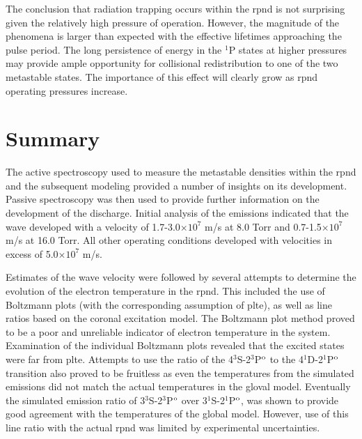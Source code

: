 The conclusion that radiation trapping occurs within the \acs{rpnd} is not
surprising given the relatively high pressure of operation. However, the
magnitude of the phenomena is larger than expected with the effective lifetimes
approaching the pulse period. The long persistence of energy in the $^1$P states
at higher pressures may provide ample opportunity for collisional redistribution
to one of the two metastable states. The importance of this effect will clearly
grow as \acs{rpnd} operating pressures increase.

\section{Summary}

The active spectroscopy used to measure the metastable densities within the
\acs{rpnd} and the subsequent modeling provided a number of insights on its
development. Passive spectroscopy was then used to provide further information
on the development of the discharge. Initial analysis of the emissions indicated
that the wave developed with a velocity of 1.7-3.0$\times10^7$ m/s at 8.0 Torr
and 0.7-1.5$\times10^7$ m/s at 16.0 Torr. All other operating conditions
developed with velocities in excess of 5.0$\times10^7$ m/s.

Estimates of the wave velocity were followed by several attempts to determine
the evolution of the electron temperature in the \acs{rpnd}. This included the
use of Boltzmann plots (with the corresponding assumption of \acs{plte}), as
well as line ratios based on the coronal excitation model. The Boltzmann plot
method proved to be a poor and unreliable indicator of electron temperature in
the system. Examination of the individual Boltzmann plots revealed that the
excited states were far from \acs{plte}. Attempts to use the ratio of the
4$^3$S-2$^3$P$^\mathrm{o}$ to the 4$^1$D-2$^1$P$^\mathrm{o}$ transition also proved to be
fruitless as even the temperatures from the simulated emissions did not match
the actual temperatures in the gloval model. Eventually the simulated emission
ratio of 3$^3$S-2$^3$P$^\mathrm{o}$ over 3$^1$S-2$^1$P$^\mathrm{o}$, was shown to provide good
agreement with the temperatures of the global model. However, use of this line
ratio with the actual \acs{rpnd} was limited by experimental uncertainties.

